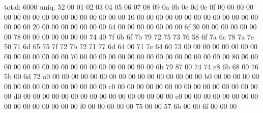 {\footnotesize
\begin{semiverbatim}
total: 6000
uniq:  52
\color{HexyGreen}\color{HexyGreen}   00 01 02 03 04 05 06 07 08 09 0a 0b 0c 0d 0e 0f
\color{HexyGreen}00 \color{Hexy0}00 00 00 00 00 00 00 00 00 00 00 00 00 00 00 00
\color{HexyGreen}10 \color{Hexy0}00 00 00 00 00 00 00 00 00 00 00 00 00 00 00 00
\color{HexyGreen}20 \color{Hexy0}00 00 00 00 00 00 00 \color{Hexy100}64 \color{Hexy0}00 00 00 00 00 00 00 \color{Hexy111}6f
\color{HexyGreen}30 \color{Hexy0}00 00 00 00 00 00 00 \color{Hexy120}78 \color{Hexy0}00 00 00 00 00 00 00 \color{Hexy116}74
\color{HexyGreen}40 \color{Hexy127}7f \color{Hexy107}6b \color{Hexy111}6f \color{Hexy123}7b \color{Hexy121}79 \color{Hexy114}72 \color{Hexy117}75 \color{Hexy115}73 \color{Hexy118}76 \color{Hexy88}58 \color{Hexy111}6f \color{Hexy122}7a \color{Hexy108}6c \color{Hexy120}78 \color{Hexy122}7a \color{Hexy126}7e
\color{HexyGreen}50 \color{Hexy113}71 \color{Hexy109}6d \color{Hexy101}65 \color{Hexy117}75 \color{Hexy127}7f \color{Hexy114}72 \color{Hexy123}7b \color{Hexy114}72 \color{Hexy113}71 \color{Hexy119}77 \color{Hexy109}6d \color{Hexy100}64 \color{Hexy0}00 \color{Hexy113}71 \color{Hexy124}7c \color{Hexy100}64
\color{HexyGreen}60 \color{Hexy115}73 \color{Hexy0}00 00 00 00 00 00 00 00 00 00 00 00 00 00 00
\color{HexyGreen}70 \color{Hexy0}00 00 00 00 00 00 00 00 00 00 00 00 00 00 00 00
\color{HexyGreen}80 \color{Hexy0}00 00 00 00 00 00 00 00 00 00 00 00 00 00 00 00
\color{HexyGreen}90 \color{Hexy0}00 \color{Hexy107}6b \color{Hexy121}79 \color{Hexy135}87 \color{Hexy0}00 \color{Hexy116}74 74 \color{Hexy232}e8 \color{Hexy107}6b \color{Hexy104}68 \color{Hexy0}00 \color{Hexy118}76 \color{Hexy91}5b \color{Hexy0}00 \color{Hexy109}6d \color{Hexy114}72
\color{HexyGreen}a0 \color{Hexy0}00 00 00 00 00 00 00 00 00 00 00 00 00 00 00 00
\color{HexyGreen}b0 \color{Hexy0}00 00 00 00 00 00 00 00 00 00 00 00 00 00 00 00
\color{HexyGreen}c0 \color{Hexy0}00 00 00 00 00 00 00 00 00 00 00 00 00 00 00 00
\color{HexyGreen}d0 \color{Hexy0}00 00 00 00 00 00 00 00 00 00 00 00 00 00 00 00
\color{HexyGreen}e0 \color{Hexy0}00 00 00 00 00 00 00 00 00 00 00 00 00 00 00 00
\color{HexyGreen}f0 \color{Hexy0}00 00 00 00 00 \color{Hexy117}75 \color{Hexy0}00 00 \color{Hexy87}57 \color{Hexy107}6b \color{Hexy0}00 00 \color{Hexy111}6f \color{Hexy0}00 00 00
\end{semiverbatim}
}
